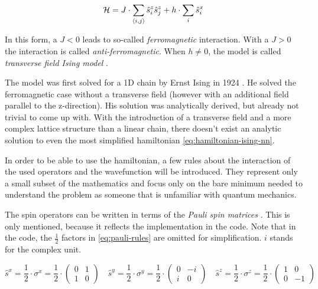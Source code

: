 \begin{equation}
    \label{eq:hamiltonian-ising-nn}
    \mathcal{H} =  J \cdot \sum\limits_{\langle i, j \rangle} \hat{s}^z_i \hat{s}^z_j + h \cdot \sum\limits_{i} \hat{s}^x_i
\end{equation}

In this form, a $J < 0$ leads to so-called \emph{ferromagnetic} interaction. With a $J > 0$ the interaction is called \emph{anti-ferromagnetic}. When $h \neq 0$, the model is called \emph{transverse field Ising model} \cite{isingBook}.

The model was first solved for a 1D chain by Ernst Ising in 1924 \cite*[]{isingFerromagnetismn}. He solved the ferromagnetic case without a transverse field (however with an additional field parallel to the z-direction). His solution was analytically derived, but already not trivial to come up with.
With the introduction of a transverse field and a more complex lattice structure than a linear chain, there doesn't exist an analytic solution to even the most simplified hamiltonian \ref{eq:hamiltonian-ising-nn}.

In order to be able to use the hamiltonian, a few rules about the interaction of the used operators and the wavefunction will be introduced. They represent only a small subset of the mathematics and focus only on the bare minimum needed to understand the problem as someone that is unfamiliar with quantum mechanics. 

The spin operators can be written in terms of the \emph{Pauli spin matrices} \cite{schwablQM}. This is only mentioned, because it reflects the implementation in the code. Note that in the code, the $\frac{1}{2}$ factors in \ref{eq:pauli-rules} are omitted for simplification. $i$ stands for the complex unit.

\begin{equation}
    \label{eq:pauli-rules}
    \hat{s}^x = \frac{1}{2} \cdot \sigma^x = \frac{1}{2} \cdot \left(\begin{matrix}
        0& 1 \\
        1& 0
    \end{matrix}\right) \quad
    \hat{s}^y = \frac{1}{2} \cdot \sigma^y = \frac{1}{2} \cdot \left(\begin{matrix}
        0& -i \\
        i& 0
    \end{matrix}\right) \quad
    \hat{s}^z = \frac{1}{2} \cdot \sigma^z = \frac{1}{2} \cdot \left(\begin{matrix}
        1& 0 \\
        0& -1
    \end{matrix}\right)
\end{equation}

